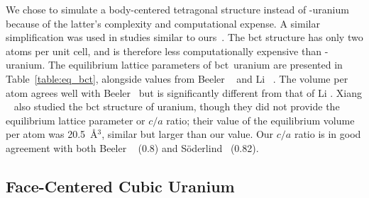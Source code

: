 We chose to simulate a body-centered tetragonal structure instead of
\textbeta-uranium because of the latter's complexity and computational expense.
A similar simplification was used in studies similar to
ours~\cite{beeler2013first,li2012structure}.
The bct structure has only two atoms per unit cell, and is therefore less
computationally expensive than \textbeta-uranium.
The equilibrium lattice parameters of bct~uranium are presented in
Table~\ref{table:eq_bct}, alongside values from Beeler
\etal~\cite{beeler2013first} and Li \etal~\cite{li2012structure}.
The volume per atom agrees well with Beeler \etal\ but is significantly
different from that of Li \etal.
Xiang \etal~\cite{xiang2008quantum} also studied the bct structure of uranium,
though they did not provide the equilibrium lattice parameter or $c/a$ ratio;
their value of the equilibrium volume per atom was 20.5~\AA$^3$, similar but
larger than our value. Our $c/a$ ratio is in good agreement with
both Beeler \etal~\cite{beeler2013first} (0.8) and
S\"oderlind~\cite{Soderlind1998} (0.82).

\subsection{Face-Centered Cubic Uranium}
\label{subsec_fcc}

